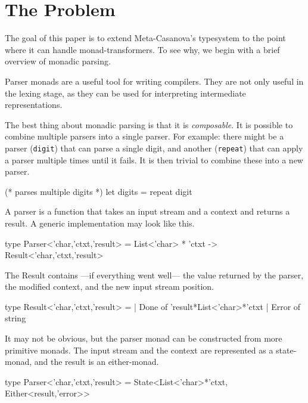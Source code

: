 \section{The Problem}
\begin{multicols}{2}
  The goal of this paper is to extend Meta-Casanova's typesystem to the point where it can handle monad-transformers.
  To see why, we begin with a brief overview of monadic parsing.
  
  Parser monads are a useful tool for writing compilers.
  They are not only useful in the lexing stage,
  as they can be used for interpreting intermediate representations.

  The best thing about monadic parsing is that it is \textit{composable}.
  It is possible to combine multiple parsers into a single parser.
  For example: there might be a parser (\texttt{digit}) that can parse a single digit,
  and another (\texttt{repeat}) that can apply a parser multiple times until it fails.
  It is then trivial to combine these into a new parser.

  \begin{code}[language=Caml]
  (* parses multiple digits *)
  let digits = repeat digit
  \end{code}

  A parser is a function that takes an input stream and a context and returns a result.
  A generic implementation may look like this.

  \begin{code}[language=Caml]
  type Parser<'char,'ctxt,'result> =
    List<'char> * 'ctxt
      -> Result<'char,'ctxt,'result>
  \end{code}
  
  The Result contains ---if everything went well--- the value returned by the parser, the modified context, and the new input stream position.
  
  \begin{code}[language=Caml]
  type Result<'char,'ctxt,'result> = 
    | Done  of 'result*List<'char>*'ctxt
    | Error of string
  \end{code}

  It may not be obvious, but the parser monad can be constructed from more primitive monads.
  The input stream and the context are represented as a state-monad, and the result is an either-monad.

  \begin{code}[language=Caml]
  type Parser<'char,'ctxt,'result> =
    State<List<'char>*'ctxt,
          Either<result,'error>>
  \end{code}


\end{multicols}
